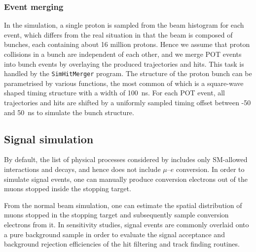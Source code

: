 \subsubsection{Event merging}
In the simulation, a single proton is sampled from the beam histogram for each event, which differs from the real situation in that the beam is composed of bunches, each containing about 16 million protons. Hence we assume that proton collisions in a bunch are independent of each other, and we merge POT events into bunch events by overlaying the produced trajectories and hits. This task is handled by the \texttt{SimHitMerger} program. The structure of the proton bunch can be parametrised by various functions, the most common of which is a square-wave shaped timing structure with a width of \SI{100}{\ns}. For each POT event, all trajectories and hits are shifted by a uniformly sampled timing offset between -50 and \SI{50}{\ns} to simulate the bunch structure. 



\subsection{Signal simulation}
By default, the list of physical processes considered by \SimG includes only SM-allowed interactions and decays, and hence does not include $\mu$--$e$ conversion. In order to simulate signal events, one can manually produce conversion electrons out of the muons stopped inside the stopping target.

From the normal beam simulation, one can estimate the spatial distribution of muons stopped in the stopping target and subsequently sample conversion electrons from it. In sensitivity studies, signal events are commonly overlaid onto a pure background sample in order to evaluate the signal acceptance and background rejection efficiencies of the hit filtering and track finding routines. %

